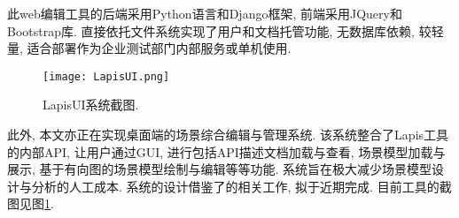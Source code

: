         此web编辑工具的后端采用Python语言和Django框架, 前端采用JQuery和Bootstrap库. 直接依托文件系统实现了用户和文档托管功能, 无数据库依赖, 较轻量, 适合部署作为企业测试部门内部服务或单机使用.
    
        \begin{figure}
            \centering
            \texttt{[image: LapisUI.png]}
            \caption{LapisUI系统截图.}
            \label{fig:lapis_ui_screenshot}
        \end{figure}
    
        \label{sec:scenario_gui_edit}
        此外, 本文亦正在实现桌面端的场景综合编辑与管理系统. 该系统整合了Lapis工具的内部API, 让用户通过GUI, 进行包括API描述文档加载与查看, 场景模型加载与展示, 基于有向图的场景模型绘制与编辑等等功能. 系统旨在极大减少场景模型设计与分析的人工成本. 系统的设计借鉴了的相关工作, 拟于近期完成. 目前工具的截图见图\ref{fig:lapis_ui_screenshot}.
        


